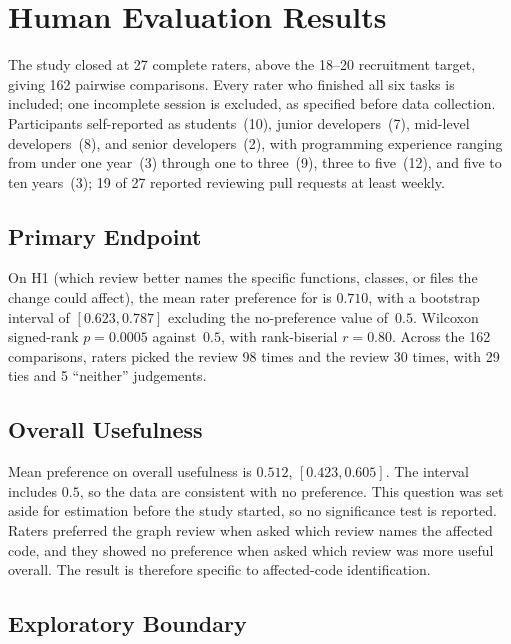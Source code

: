 \section{Human Evaluation Results}
\label{sec:results-human}

The study closed at 27 complete raters, above the 18--20 recruitment target,
giving 162 pairwise comparisons. Every rater who finished all six tasks is
included; one incomplete session is excluded, as specified before data
collection. Participants self-reported as students~(10), junior
developers~(7), mid-level developers~(8), and senior developers~(2), with
programming experience ranging from under one year~(3) through one to
three~(9), three to five~(12), and five to ten years~(3); 19 of 27
reported reviewing pull requests at least weekly.

\subsection{Primary Endpoint}
\label{sec:results-human-primary}

On H1 (which review better names the specific functions, classes, or files
the change could affect), the mean rater preference for \kg{} is $0.710$,
with a bootstrap interval of $[0.623, 0.787]$ excluding the no-preference
value of~$0.5$. Wilcoxon signed-rank $p = 0.0005$ against~$0.5$, with
rank-biserial $r = 0.80$. Across the 162 comparisons, raters picked the
\kg{} review 98 times and the \baseline{} review 30 times, with 29 ties and
5 ``neither'' judgements.

\subsection{Overall Usefulness}
\label{sec:results-human-overall}

Mean preference on overall usefulness is $0.512$, $[0.423, 0.605]$.
The interval includes $0.5$, so the data are consistent with no preference.
This question was set aside for estimation before the study started, so no
significance test is reported. Raters preferred the graph review when asked
which review names the affected code, and they showed no preference when asked
which review was more useful overall. The result is therefore specific to
affected-code identification.

\subsection{Exploratory Boundary}

